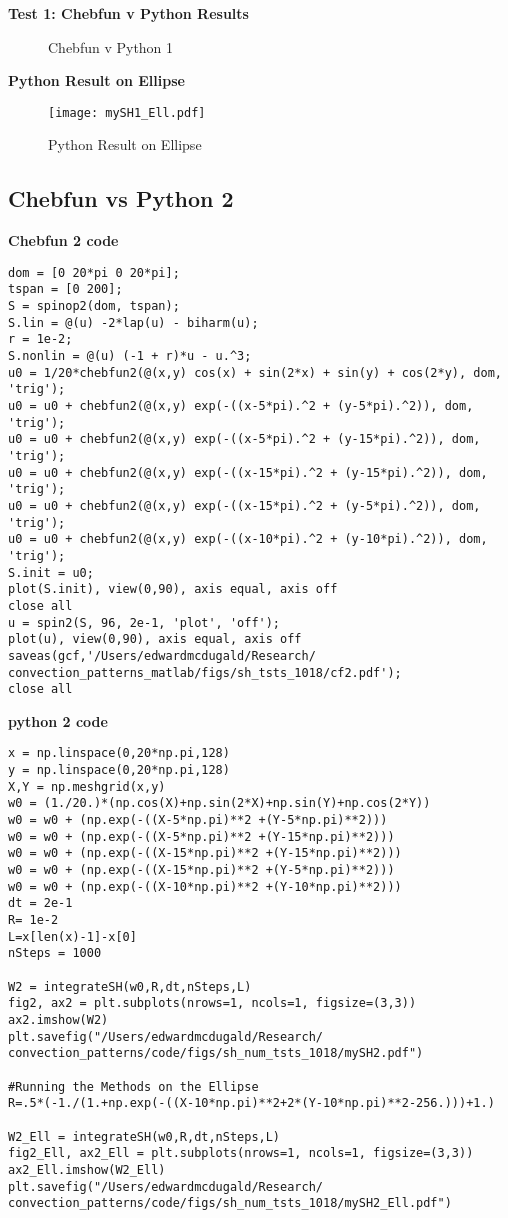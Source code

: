 \documentclass[12pt]{article}
\begin{document}
\textbf{Test 1: Chebfun v Python Results}
\begin{figure}[!tbp]
  \centering
  \hfill
  \caption{Chebfun v Python 1}
\end{figure}
\FloatBarrier

\textbf{Python Result on Ellipse}
\begin{figure}[ht]
        \centering
        \texttt{[image: mySH1\_Ell.pdf]}
        \label{fig:1}
        \caption{Python Result on Ellipse}
\end{figure}
\FloatBarrier



\subsection{Chebfun vs Python 2}
\textbf{Chebfun 2 code}
\begin{verbatim}
dom = [0 20*pi 0 20*pi];
tspan = [0 200];
S = spinop2(dom, tspan);
S.lin = @(u) -2*lap(u) - biharm(u);
r = 1e-2;
S.nonlin = @(u) (-1 + r)*u - u.^3;
u0 = 1/20*chebfun2(@(x,y) cos(x) + sin(2*x) + sin(y) + cos(2*y), dom, 'trig');
u0 = u0 + chebfun2(@(x,y) exp(-((x-5*pi).^2 + (y-5*pi).^2)), dom, 'trig');
u0 = u0 + chebfun2(@(x,y) exp(-((x-5*pi).^2 + (y-15*pi).^2)), dom, 'trig');
u0 = u0 + chebfun2(@(x,y) exp(-((x-15*pi).^2 + (y-15*pi).^2)), dom, 'trig');
u0 = u0 + chebfun2(@(x,y) exp(-((x-15*pi).^2 + (y-5*pi).^2)), dom, 'trig');
u0 = u0 + chebfun2(@(x,y) exp(-((x-10*pi).^2 + (y-10*pi).^2)), dom, 'trig');
S.init = u0;
plot(S.init), view(0,90), axis equal, axis off
close all
u = spin2(S, 96, 2e-1, 'plot', 'off');
plot(u), view(0,90), axis equal, axis off
saveas(gcf,'/Users/edwardmcdugald/Research/
convection_patterns_matlab/figs/sh_tsts_1018/cf2.pdf');
close all
\end{verbatim}

\textbf{python 2 code}
\begin{verbatim}
x = np.linspace(0,20*np.pi,128)
y = np.linspace(0,20*np.pi,128)
X,Y = np.meshgrid(x,y)
w0 = (1./20.)*(np.cos(X)+np.sin(2*X)+np.sin(Y)+np.cos(2*Y))
w0 = w0 + (np.exp(-((X-5*np.pi)**2 +(Y-5*np.pi)**2)))
w0 = w0 + (np.exp(-((X-5*np.pi)**2 +(Y-15*np.pi)**2)))
w0 = w0 + (np.exp(-((X-15*np.pi)**2 +(Y-15*np.pi)**2)))
w0 = w0 + (np.exp(-((X-15*np.pi)**2 +(Y-5*np.pi)**2)))
w0 = w0 + (np.exp(-((X-10*np.pi)**2 +(Y-10*np.pi)**2)))
dt = 2e-1
R= 1e-2
L=x[len(x)-1]-x[0]
nSteps = 1000

W2 = integrateSH(w0,R,dt,nSteps,L)
fig2, ax2 = plt.subplots(nrows=1, ncols=1, figsize=(3,3))
ax2.imshow(W2)
plt.savefig("/Users/edwardmcdugald/Research/
convection_patterns/code/figs/sh_num_tsts_1018/mySH2.pdf")

#Running the Methods on the Ellipse
R=.5*(-1./(1.+np.exp(-((X-10*np.pi)**2+2*(Y-10*np.pi)**2-256.)))+1.)

W2_Ell = integrateSH(w0,R,dt,nSteps,L)
fig2_Ell, ax2_Ell = plt.subplots(nrows=1, ncols=1, figsize=(3,3))
ax2_Ell.imshow(W2_Ell)
plt.savefig("/Users/edwardmcdugald/Research/
convection_patterns/code/figs/sh_num_tsts_1018/mySH2_Ell.pdf")
\end{verbatim}
\FloatBarrier
\end{document}
